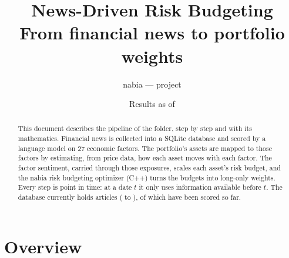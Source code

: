\documentclass[11pt,a4paper]{article}
\title{News-Driven Risk Budgeting\\[4pt]\large From financial news to portfolio weights}
\author{nabia --- \code{python/} project}
\date{Results as of \WeightDate}
\newcommand{\code}[1]{\texttt{\detokenize{#1}}}
\begin{document}
\maketitle

\begin{abstract}
This document describes the pipeline of the \code{python/} folder, step by step and with its mathematics. Financial
news is collected into a SQLite database and scored by a language model on 27 economic factors. The portfolio's
assets are mapped to those factors by estimating, from price data, how each asset moves with each factor. The
factor sentiment, carried through those exposures, scales each asset's risk budget, and the nabia risk budgeting
optimizer (C++) turns the budgets into long-only weights. Every step is point in time: at a date $t$ it only uses
information available before $t$. The database currently holds \NewsCount{} articles (\NewsFirst{} to \NewsLast{}),
of which \ScoredCount{} have been scored so far.
\end{abstract}

\tableofcontents

\section{Overview}
\end{document}
